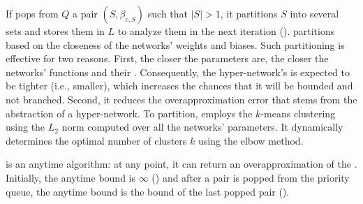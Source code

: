 If \boundtool pops from $Q$ a pair $(S,\beta_{c,S})$ such that $|S|>1$, 
it partitions $S$ into several sets and stores them in $L$ to analyze them in the next iteration (). %
\boundtool partitions based on the closeness of the networks' weights and biases.
Such partitioning is effective for two reasons. 
First, the closer the parameters are, the closer the networks' functions and their \propa. Consequently, the hyper-network's \propa is expected to be tighter (i.e., smaller), which increases the chances that it will be bounded and not branched.
Second, it reduces the overapproximation error that stems from the abstraction of a hyper-network. 
To partition, \tool employs the $k$-means clustering~\cite{ref82} using the $L_2$ norm computed over all the networks' parameters. 
It dynamically determines the optimal number of clusters $k$ using the elbow method. 

\boundtool is an anytime algorithm: at any point, it can return an overapproximation of the \propa. Initially, the anytime bound is $\infty$ () and after a pair is popped from the priority queue, the anytime bound is the bound of the last popped pair (). 

